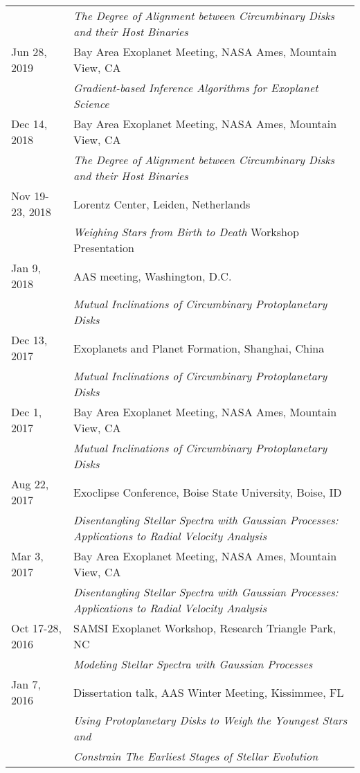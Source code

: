 \begin{longtable}{@{\hspace{10pt}}p{1.2in}l}
  & \emph{The Degree of Alignment between Circumbinary Disks and their Host Binaries} \\[\rowskip]
  Jun 28, 2019 & Bay Area Exoplanet Meeting, NASA Ames, Mountain View, CA\\
  & \emph{Gradient-based Inference Algorithms for Exoplanet Science} \\[\rowskip]
  Dec 14, 2018 & Bay Area Exoplanet Meeting, NASA Ames, Mountain View, CA\\
  & \emph{The Degree of Alignment between Circumbinary Disks and their Host Binaries} \\[\rowskip]
  Nov 19-23, 2018 & Lorentz Center, Leiden, Netherlands\\
  & \emph{Weighing Stars from Birth to Death} Workshop Presentation \\[\rowskip]
  Jan 9, 2018 & AAS meeting, Washington, D.C. \\
  & \emph{Mutual Inclinations of Circumbinary Protoplanetary Disks} \\[\rowskip]
  Dec 13, 2017 & Exoplanets and Planet Formation, Shanghai, China \\
  & \emph{Mutual Inclinations of Circumbinary Protoplanetary Disks} \\[\rowskip]
  Dec 1, 2017 & Bay Area Exoplanet Meeting, NASA Ames, Mountain View, CA\\
  & \emph{Mutual Inclinations of Circumbinary Protoplanetary Disks} \\[\rowskip]
  Aug 22, 2017 & Exoclipse Conference, Boise State University, Boise, ID\\
  & \emph{Disentangling Stellar Spectra with Gaussian Processes: Applications to Radial Velocity Analysis} \\[\rowskip]
  Mar 3, 2017 & Bay Area Exoplanet Meeting, NASA Ames, Mountain View, CA\\
  & \emph{Disentangling Stellar Spectra with Gaussian Processes: Applications to Radial Velocity Analysis} \\[\rowskip]
  Oct 17-28, 2016 & SAMSI Exoplanet Workshop, Research Triangle Park, NC\\
  & \emph{Modeling Stellar Spectra with Gaussian Processes} \\[\rowskip]
  Jan 7, 2016 & Dissertation talk, AAS Winter Meeting, Kissimmee, FL \\
  & \emph{Using Protoplanetary Disks to Weigh the Youngest Stars and} \\
  & \emph{Constrain The Earliest Stages of Stellar Evolution} \\[\rowskip]

\end{longtable}
